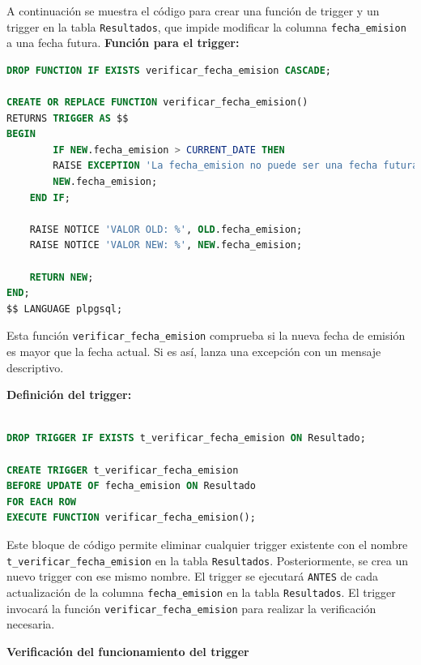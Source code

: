 \documentclass[spanish]{article}
\begin{document}
A continuación se muestra el código para crear una función de trigger y un trigger en la tabla \texttt{Resultados}, que impide modificar la columna \texttt{fecha\_emision} a una fecha futura.
\newpage
\textbf{Función para el trigger:}

\begin{lstlisting}[language=SQL] 
DROP FUNCTION IF EXISTS verificar_fecha_emision CASCADE;

CREATE OR REPLACE FUNCTION verificar_fecha_emision() 
RETURNS TRIGGER AS $$ 
BEGIN 
        IF NEW.fecha_emision > CURRENT_DATE THEN 
        RAISE EXCEPTION 'La fecha_emision no puede ser una fecha futura: %', 
        NEW.fecha_emision; 
    END IF; 
        
    RAISE NOTICE 'VALOR OLD: %', OLD.fecha_emision;
    RAISE NOTICE 'VALOR NEW: %', NEW.fecha_emision;
 
    RETURN NEW; 
END; 
$$ LANGUAGE plpgsql; 
\end{lstlisting}

Esta función \texttt{verificar\_fecha\_emision} comprueba si la nueva fecha de emisión es mayor que la fecha actual. Si es así, lanza una excepción con un mensaje descriptivo.

\textbf{Definición del trigger:}

\begin{lstlisting}[language=SQL] 

DROP TRIGGER IF EXISTS t_verificar_fecha_emision ON Resultado;

CREATE TRIGGER t_verificar_fecha_emision 
BEFORE UPDATE OF fecha_emision ON Resultado 
FOR EACH ROW 
EXECUTE FUNCTION verificar_fecha_emision(); 
\end{lstlisting}

Este bloque de código permite eliminar cualquier trigger existente con el nombre \texttt{t\_verificar\_fecha\_emision} en la tabla \texttt{Resultados}. Posteriormente, se crea un nuevo trigger con ese mismo nombre. El trigger se ejecutará \texttt{ANTES} de cada actualización de la columna \texttt{fecha\_emision} en la tabla \texttt{Resultados}. El trigger invocará la función \texttt{verificar\_fecha\_emision} para realizar la verificación necesaria.

\textbf{Verificación del funcionamiento del trigger}
\end{document}
